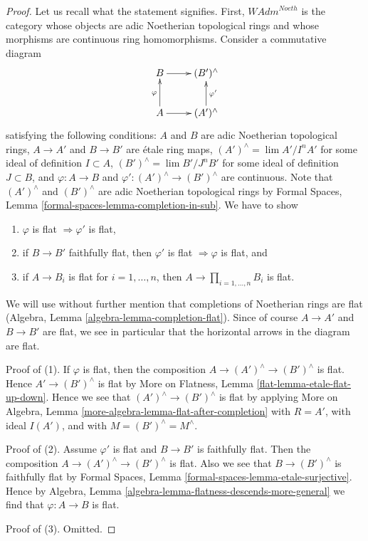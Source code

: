 \documentclass{stacks-project}
\theoremstyle{plain}
\theoremstyle{definition}
\theoremstyle{remark}
\numberwithin{equation}{subsection}
\def\lim{\mathop{\mathrm{lim}}\nolimits}
\begin{document}
\begin{proof}
Let us recall what the statement signifies. First, 
$\textit{WAdm}^{Noeth}$ is the category whose objects are
adic Noetherian topological rings and whose morphisms are
continuous ring homomorphisms. Consider a commutative diagram
$$
\xymatrix{
B \ar[r] & (B')^\wedge \\
A \ar[r] \ar[u]^\varphi & (A')^\wedge \ar[u]_{\varphi'}
}
$$
satisfying the following conditions:
$A$ and $B$ are adic Noetherian topological rings,
$A \to A'$ and $B \to B'$ are \'etale ring maps,
$(A')^\wedge = \lim A'/I^nA'$ for some ideal of definition $I \subset A$,
$(B')^\wedge = \lim B'/J^nB'$ for some ideal of definition $J \subset B$, and
$\varphi : A \to B$ and $\varphi' : (A')^\wedge \to (B')^\wedge$
are continuous. Note that $(A')^\wedge$ and $(B')^\wedge$ are
adic Noetherian topological rings by
Formal Spaces, Lemma \ref{formal-spaces-lemma-completion-in-sub}.
We have to show
\begin{enumerate}
\item $\varphi$ is flat $\Rightarrow \varphi'$ is flat,
\item if $B \to B'$ faithfully flat, then $\varphi'$ is flat
$\Rightarrow \varphi$ is flat, and
\item if $A \to B_i$ is flat for $i = 1, \ldots, n$, then
$A \to \prod_{i = 1, \ldots, n} B_i$ is flat.
\end{enumerate}
We will use without further mention that completions of Noetherian rings
are flat (Algebra, Lemma \ref{algebra-lemma-completion-flat}). Since
of course $A \to A'$ and $B \to B'$ are flat, we see in
particular that the horizontal arrows in the diagram are flat.

\medskip\noindent
Proof of (1). If $\varphi$ is flat, then the composition
$A \to (A')^\wedge \to (B')^\wedge$ is flat. Hence $A' \to (B')^\wedge$
is flat by More on Flatness, Lemma \ref{flat-lemma-etale-flat-up-down}.
Hence we see that $(A')^\wedge \to (B')^\wedge$ is flat by applying
More on Algebra, Lemma \ref{more-algebra-lemma-flat-after-completion}
with $R = A'$, with ideal $I(A')$, and with $M = (B')^\wedge = M^\wedge$.

\medskip\noindent
Proof of (2). Assume $\varphi'$ is flat and $B \to B'$ is faithfully flat.
Then the composition $A \to (A')^\wedge \to (B')^\wedge$ is flat.
Also we see that $B \to (B')^\wedge$ is faithfully flat by
Formal Spaces, Lemma
\ref{formal-spaces-lemma-etale-surjective}.
Hence by Algebra, Lemma \ref{algebra-lemma-flatness-descends-more-general}
we find that $\varphi : A \to B$ is flat.

\medskip\noindent
Proof of (3). Omitted.
\end{proof}
\end{document}
